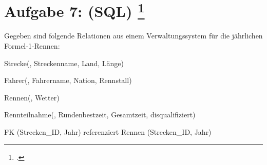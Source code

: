 \documentclass{lehramt-informatik-aufgabe}
\begin{document}
\section{Aufgabe 7: (SQL)
\footcite{66116:2019:09}}

Gegeben sind folgende Relationen aus einem Verwaltungssystem für die
jährlichen Formel-1-Rennen:

\begin{liRmodell}
Strecke(, Streckenname, Land, Länge)

Fahrer(, Fahrername, Nation, Rennstall)

Rennen(, Wetter)

Rennteilnahme(, Rundenbestzeit, Gesamtzeit,
disqualifiziert)

FK (Strecken\_ID, Jahr) referenziert Rennen (Strecken\_ID, Jahr)
\end{liRmodell}
\end{document}
